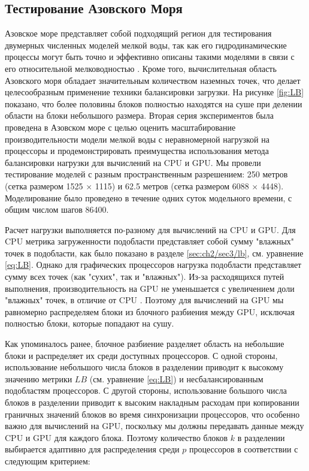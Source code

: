 \subsection{Тестирование Азовского Моря}\label{sec:ch3/sec1/sub2}

Азовское море представляет собой подходящий регион для тестирования двумерных численных моделей мелкой воды, так как его гидродинамические процессы могут быть точно и эффективно описаны такими моделями в связи с его относительной мелководностью \cite{Azov}.
Кроме того, вычислительная область Азовского моря обладает значительным количеством наземных точек, что делает целесообразным применение техники балансировки загрузки.
На рисунке \ref{fig:LB} показано, что более половины блоков полностью находятся на суше при делении области на блоки небольшого размера.
Вторая серия экспериментов была проведена в Азовском море с целью оценить масштабирование производительности модели мелкой воды с неравномерной нагрузкой на процессоры и продемонстрировать преимущества использования метода балансировки нагрузки для вычислений на CPU и GPU.
Мы провели тестирование моделей с разным пространственным разрешением: 250 метров (сетка размером 1525 $\times$ 1115) и 62.5 метров (сетка размером 6088 $\times$ 4448). Моделирование было проведено в течение одних суток модельного времени, с общим числом шагов 86400.  


Расчет нагрузки выполняется по-разному для вычислений на CPU и GPU.
Для CPU метрика загруженности подобласти представляет собой сумму "влажных" точек в подобласти, как было показано в разделе \ref{sec:ch2/sec3/lb}, см. уравнение \ref{eq:LB}.
Однако для графических процессоров нагрузка подобласти представляет сумму всех точек (как "сухих", так и "влажных").
Из-за расходящихся путей выполнения, производительность на GPU не уменьшается с увеличением доли "влажных" точек, в отличие от CPU \cite{kirk10}.
Поэтому для вычислений на GPU мы равномерно распределяем блоки из блочного разбиения между GPU, исключая полностью блоки, которые попадают на сушу.

Как упоминалось ранее, блочное разбиение разделяет область на небольшие блоки и распределяет их среди доступных процессоров.
С одной стороны, использование небольшого числа блоков в разделении приводит к высокому значению метрики $LB$ (см. уравнение \ref{eq:LB}) и несбалансированным подобластям процессоров.
С другой стороны, использование большого числа блоков в разделении приводит к высоким накладным расходам при копировании граничных значений блоков во время синхронизации процессоров, что особенно важно для вычислений на GPU, поскольку мы должны передавать данные между CPU и GPU для каждого блока.
Поэтому количество блоков $k$ в разделении выбирается адаптивно для распределения среди $p$ процессоров в соответствии с следующим критерием:

